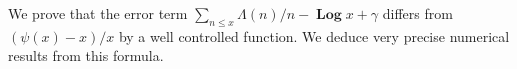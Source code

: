 \documentclass{article}
\def\Log{\mathop{\textbf{Log}}}
\begin{document}
  We prove that the error term $\sum_{{n\le
      x}}\Lambda(n)/n-\Log x+\gamma$
  differs from $(\psi(x)-x)/x$ by a well controlled function.
  We deduce very precise numerical results from this formula.
\end{document}

